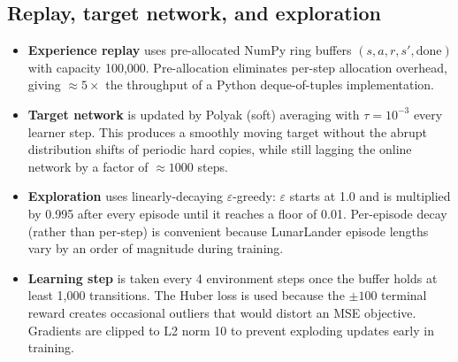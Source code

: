 \documentclass[11pt,a4paper]{article}
\begin{document}
\subsection{Replay, target network, and exploration}
\begin{itemize}
  \item \textbf{Experience replay} uses pre-allocated NumPy ring
    buffers $(s, a, r, s', \text{done})$ with capacity 100{,}000.
    Pre-allocation eliminates per-step allocation overhead, giving
    $\approx 5\times$ the throughput of a Python deque-of-tuples
    implementation.
  \item \textbf{Target network} is updated by Polyak (soft) averaging
    with $\tau = 10^{-3}$ every learner step. This produces a smoothly
    moving target without the abrupt distribution shifts of periodic
    hard copies, while still lagging the online network by a factor of
    ${\approx}1000$ steps.
  \item \textbf{Exploration} uses linearly-decaying $\varepsilon$-greedy:
    $\varepsilon$ starts at 1.0 and is multiplied by 0.995 after every
    episode until it reaches a floor of 0.01. Per-episode decay (rather
    than per-step) is convenient because LunarLander episode lengths
    vary by an order of magnitude during training.
  \item \textbf{Learning step} is taken every 4 environment steps once
    the buffer holds at least 1{,}000 transitions. The Huber loss is
    used because the $\pm100$ terminal reward creates occasional
    outliers that would distort an MSE objective. Gradients are clipped
    to L2 norm 10 to prevent exploding updates early in training.
\end{itemize}
\end{document}
